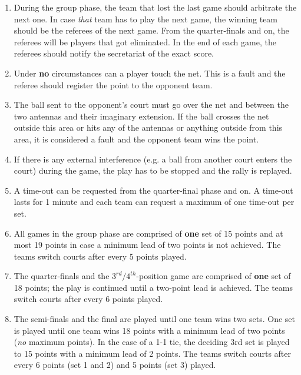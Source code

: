 \documentclass[a4paper,11pt]{article}
\begin{document}
\begin{enumerate}
\item During the group phase, the team that lost the last game should arbitrate
  the next one. In case \textit{that} team has to play the next game, the
  winning team should be the referees of the next game. From the quarter-finals
  and on, the referees will be players that got eliminated. In the end of each
  game, the referees should notify the secretariat of the exact score.

\item Under \textbf{no} circumstances can a player touch the net. This is a
  fault and the referee should register the point to the opponent team.

\item The ball sent to the opponent’s court must go over the net and between the
  two antennas and their imaginary extension. If the ball crosses the net
  outside this area or hits any of the antennas or anything outside from this
  area, it is considered a fault and the opponent team wins the point.

\item If there is any external interference (e.g. a ball from another court
  enters the court) during the game, the play has to be stopped and the rally is
  replayed.

\item A time-out can be requested from the quarter-final phase and on. A
  time-out lasts for 1 minute and each team can request a maximum of one
  time-out per set.

\item All games in the group phase are comprised of \textbf{one} set of 15
  points and at most 19 points in case a minimum lead of two points is not
  achieved. The teams switch courts after every 5 points played.

\item The quarter-finals and the $3^{rd}/4^{th}$-position game are comprised of
  \textbf{one} set of 18 points; the play is continued until a two-point lead is
  achieved. The teams switch courts after every 6 points played.

\item The semi-finals and the final are played until one team wins two sets. One
  set is played until one team wins 18 points with a minimum lead of two points
  (\textit{no} maximum points). In the case of a 1-1 tie, the deciding 3rd set
  is played to 15 points with a minimum lead of 2 points. The teams switch
  courts after every 6 points (set 1 and 2) and 5 points (set 3) played.


\end{enumerate}
\end{document}
